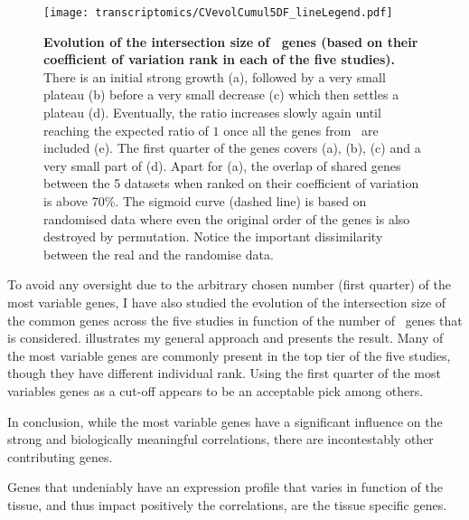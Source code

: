 \begin{figure}[!htpb]
    \texttt{[image: transcriptomics/CVevolCumul5DF\_lineLegend.pdf]}\centering
    \caption[Evolution of the intersection size of \setOne\ genes (ranked by cv)]%
    {\label{fig:cvEvol5DF}\textbf{Evolution of the intersection size
    of \setOne\ genes (based on their coefficient of variation rank
    in each of the five studies).}
    There is an initial strong growth (a),
    followed by a very small plateau (b)
    before a very small decrease (c)
    which then settles a plateau (d).
    Eventually, the ratio increases slowly again
    until reaching the expected ratio of $1$ once all the genes from \setOne\
    are included (e).
    The first quarter of the genes covers (a), (b), (c)
    and a very small part of (d).
    Apart for (a),
    the overlap of shared genes between the 5 datasets when ranked on their
    coefficient of variation is above 70\%.
    The sigmoid curve (dashed line) is based on randomised data
    where even the original order of the genes is also destroyed by permutation.
    Notice the important dissimilarity between the real and the randomise data.}
\end{figure}

To avoid any oversight due to the arbitrary chosen number (first quarter)
of the most variable genes,
I have also studied the evolution of the intersection size of the common genes
across the five studies
in function of the number of \setOne\ genes that is considered.
 illustrates my general approach and
 presents the result.
Many of the most variable genes are commonly present in the top tier of the
five studies, though they have different individual rank.
Using the first quarter of the most variables genes as a cut-off appears
to be an acceptable pick among others.

\begin{comment}
If the previous analysis was to include
only the first 1,250 most variable genes
the results of \Cref{fig:heatmapMost25pVariable} may be even greater.
However, the dissimilarities highlighted by \Cref{fig:ReverseheatmapMost25pVariable}
would also be greater.
\end{comment}

In conclusion, while the most variable genes have a significant influence
on the strong and biologically meaningful correlations,
there are incontestably other contributing genes.

Genes that undeniably have an expression profile
that varies in function of the tissue,
and thus impact positively the correlations,
are the tissue specific genes.

